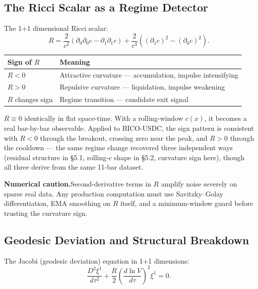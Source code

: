 \documentclass[12pt,a4paper]{article}
\begin{document}
\subsection{The Ricci Scalar as a Regime Detector}

The 1+1 dimensional Ricci scalar:
\begin{equation}
    R = \frac{2}{c^2}\!\left(\partial_0\partial_0 c - \partial_1\partial_1 c\right)
      + \frac{2}{c^3}\!\left((\partial_1 c)^2 - (\partial_0 c)^2\right).
\end{equation}

\begin{center}
\begin{tabular}{ll}
\toprule
Sign of $R$ & Meaning \\
\midrule
$R < 0$ & Attractive curvature --- accumulation, impulse intensifying \\
$R > 0$ & Repulsive curvature --- liquidation, impulse weakening \\
$R$ changes sign & Regime transition --- candidate exit signal \\
\bottomrule
\end{tabular}
\end{center}

$R\equiv0$ identically in flat space-time. With a rolling-window $c(x)$,
it becomes a real bar-by-bar observable. Applied to BICO-USDC, the sign
pattern is consistent with $R<0$ through the breakout, crossing zero near
the peak, and $R>0$ through the cooldown --- the same regime change
recovered three independent ways (residual structure in \S5.1, rolling-$c$
shape in \S5.2, curvature sign here), though all three derive from the same
11-bar dataset.

\textbf{Numerical caution.}\quad Second-derivative terms in $R$ amplify
noise severely on sparse real data. Any production computation must use
Savitzky--Golay differentiation, EMA smoothing on $R$ itself, and a
minimum-window guard before trusting the curvature sign.

\subsection{Geodesic Deviation and Structural Breakdown}

The Jacobi (geodesic deviation) equation in 1+1 dimensions:
\begin{equation}
    \frac{D^2\xi^1}{d\tau^2} + \frac{R}{2}\left(\frac{d\ln V}{d\tau}\right)^2\xi^1 = 0.
\end{equation}
\end{document}
